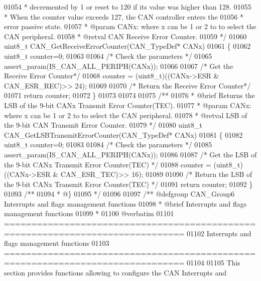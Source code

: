 \begin{DoxyCode}
01054 \textcolor{comment}{  *         decremented by 1 or reset to 120 if its value was higher than 128. }
01055 \textcolor{comment}{  *         When the counter value exceeds 127, the CAN controller enters the }
01056 \textcolor{comment}{  *         error passive state.  }
01057 \textcolor{comment}{  * @param  CANx: where x can be 1 or 2 to to select the CAN peripheral.  }
01058 \textcolor{comment}{  * @retval CAN Receive Error Counter. }
01059 \textcolor{comment}{  */}
01060 uint8\_t CAN_GetReceiveErrorCounter(CAN\_TypeDef* CANx)
01061 \{
01062   uint8\_t counter=0;
01063 
01064   \textcolor{comment}{/* Check the parameters */}
01065   assert_param(IS\_CAN\_ALL\_PERIPH(CANx));
01066 
01067   \textcolor{comment}{/* Get the Receive Error Counter*/}
01068   counter = (uint8\_t)((CANx->ESR & CAN_ESR_REC)>> 24);
01069 
01070   \textcolor{comment}{/* Return the Receive Error Counter*/}
01071   \textcolor{keywordflow}{return} counter;
01072 \}
01073 
01074 
01075 \textcolor{comment}{/**}
01076 \textcolor{comment}{  * @brief  Returns the LSB of the 9-bit CANx Transmit Error Counter(TEC).}
01077 \textcolor{comment}{  * @param  CANx: where x can be 1 or 2 to to select the CAN peripheral.}
01078 \textcolor{comment}{  * @retval LSB of the 9-bit CAN Transmit Error Counter. }
01079 \textcolor{comment}{  */}
01080 uint8\_t CAN_GetLSBTransmitErrorCounter(CAN\_TypeDef* CANx)
01081 \{
01082   uint8\_t counter=0;
01083 
01084   \textcolor{comment}{/* Check the parameters */}
01085   assert_param(IS\_CAN\_ALL\_PERIPH(CANx));
01086 
01087   \textcolor{comment}{/* Get the LSB of the 9-bit CANx Transmit Error Counter(TEC) */}
01088   counter = (uint8\_t)((CANx->ESR & CAN_ESR_TEC)>> 16);
01089 
01090   \textcolor{comment}{/* Return the LSB of the 9-bit CANx Transmit Error Counter(TEC) */}
01091   \textcolor{keywordflow}{return} counter;
01092 \}
01093 \textcolor{comment}{/**}
01094 \textcolor{comment}{  * @\}}
01095 \textcolor{comment}{  */}
01096 
01097 \textcolor{comment}{/** @defgroup CAN\_Group6 Interrupts and flags management functions}
01098 \textcolor{comment}{ *  @brief   Interrupts and flags management functions}
01099 \textcolor{comment}{ *}
01100 \textcolor{comment}{@verbatim   }
01101 \textcolor{comment}{ ===============================================================================}
01102 \textcolor{comment}{                   Interrupts and flags management functions}
01103 \textcolor{comment}{ ===============================================================================  }
01104 \textcolor{comment}{}
01105 \textcolor{comment}{  This section provides functions allowing to configure the CAN Interrupts and }

\end{DoxyCode}
